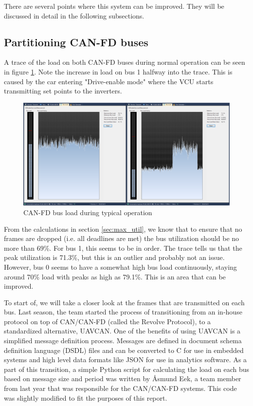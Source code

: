 There are several points where this system can be improved. They will be discussed in detail in the following subsections.


\subsection{Partitioning CAN-FD buses}

A trace of the load on both CAN-FD buses during normal operation can be seen in figure \ref{fig:canfd_load}. Note the increase in load on bus 1 halfway into the trace. This is caused by the car entering "Drive-enable mode" where the VCU starts transmitting set points to the inverters.

\begin{figure}[h!]
    \centering
    \includegraphics[width=.85\textwidth]{media/canfd-load.png}
    \caption{CAN-FD bus load during typical operation}
    \label{fig:canfd_load}
\end{figure}

From the calculations in section \ref{sec:max_util}, we know that to ensure that no frames are dropped (i.e. all deadlines are met) the bus utilization should be no more than 69\%. For bus 1, this seems to be in order. The trace tells us that the peak utilization is 71.3\%, but this is an outlier and probably not an issue. However, bus 0 seems to have a somewhat high bus load continuously, staying around 70\% load with peaks as high as 79.1\%. This is an area that can be improved.

To start of, we will take a closer look at the frames that are transmitted on each bus. Last season, the team started the process of transitioning from an in-house protocol on top of CAN/CAN-FD (called the Revolve Protocol), to a standardized alternative, UAVCAN. One of the benefits of using UAVCAN is a simplified message definition process. Messages are defined in document schema definition language (DSDL) files and can be converted to C for use in embedded systems and high level data formats like JSON for use in analytics software. As a part of this transition, a simple Python script for calculating the load on each bus based on message size and period was written by Åsmund Eek, a team member from last year that was responsible for the CAN/CAN-FD systems. This code was slightly modified to fit the purposes of this report. 

